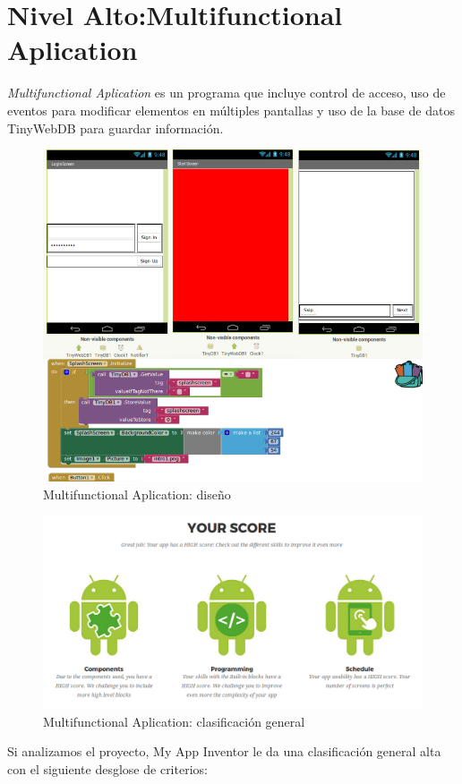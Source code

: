 \documentclass[a4paper, 12pt]{book}
\begin{document}
\section{Nivel Alto:Multifunctional Aplication} 
\textit{Multifunctional Aplication} es un programa que incluye control de acceso, uso de eventos para modificar elementos en múltiples pantallas y uso de la base de datos TinyWebDB para guardar información. 
\begin{figure}[H]
  \centering
  \includegraphics[width=0.60\linewidth, keepaspectratio]{img/MultiApp}
  \caption{Multifunctional Aplication: diseño}
  \label{fig:MultifunctionalApp}
\end{figure}
\begin{figure}[H]
  \centering
  \includegraphics[width=\linewidth, keepaspectratio]{img/MultifunctionalAppGlobal}
  \caption{Multifunctional Aplication: clasificación general}
  \label{fig:MultifunctionalApp}
\end{figure}
Si analizamos el proyecto, My App Inventor le da una clasificación general alta con el siguiente desglose de criterios:
\end{document}
